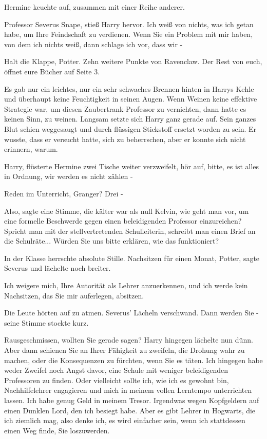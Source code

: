 Hermine keuchte auf, zusammen mit einer Reihe anderer.

\glqq{}Professor Severus Snape\grqq{}, stieß Harry hervor. \glqq{}Ich weiß von
nichts, was ich getan habe, um Ihre Feindschaft zu verdienen. Wenn Sie ein
Problem mit mir haben, von dem ich nichts weiß, dann schlage ich vor, dass wir
-\grqq{}

\glqq{}Halt die Klappe, Potter. Zehn weitere Punkte von Ravenclaw. Der Rest von
euch, öffnet eure Bücher auf Seite 3.\grqq{}

Es gab nur ein leichtes, nur ein sehr schwaches Brennen hinten in Harrys Kehle
und überhaupt keine Feuchtigkeit in seinen Augen. Wenn Weinen keine effektive
Strategie war, um diesen Zaubertrank-Professor zu vernichten, dann hatte es
keinen Sinn, zu weinen. Langsam setzte sich Harry ganz gerade auf. Sein ganzes
Blut schien weggesaugt und durch flüssigen Stickstoff ersetzt worden zu sein. Er
wusste, dass er versucht hatte, sich zu beherrschen, aber er konnte sich nicht
erinnern, warum.

\glqq{}Harry\grqq{}, flüsterte Hermine zwei Tische weiter verzweifelt, \glqq{}hör
auf, bitte, es ist alles in Ordnung, wir werden es nicht zählen -\grqq{}

\glqq{}Reden im Unterricht, Granger? Drei -\grqq{}

\glqq{}Also\grqq{}, sagte eine Stimme, die kälter war als null Kelvin, \glqq{}wie
geht man vor, um eine formelle Beschwerde gegen einen beleidigenden Professor
einzureichen? Spricht man mit der stellvertretenden Schulleiterin, schreibt man
einen Brief an die Schulräte... Würden Sie uns bitte erklären, wie das
funktioniert?\grqq{}

In der Klasse herrschte absolute Stille. \glqq{}Nachsitzen für einen Monat,
Potter\grqq{}, sagte Severus und lächelte noch breiter.

\glqq{}Ich weigere mich, Ihre Autorität als Lehrer anzuerkennen, und ich werde
kein Nachsitzen, das Sie mir auferlegen, absitzen.\grqq{}

Die Leute hörten auf zu atmen. Severus' Lächeln verschwand. \glqq{}Dann werden
Sie -\grqq{} seine Stimme stockte kurz.

\glqq{}Rausgeschmissen, wollten Sie gerade sagen?\grqq{} Harry hingegen lächelte
nun dünn. \glqq{}Aber dann schienen Sie an Ihrer Fähigkeit zu zweifeln, die
Drohung wahr zu machen, oder die Konsequenzen zu fürchten, wenn Sie es täten.
Ich hingegen habe weder Zweifel noch Angst davor, eine Schule mit weniger
beleidigenden Professoren zu finden. Oder vielleicht sollte ich, wie ich es
gewohnt bin, Nachhilfelehrer engagieren und mich in meinem vollen Lerntempo
unterrichten lassen. Ich habe genug Geld in meinem Tresor. Irgendwas wegen
Kopfgeldern auf einen Dunklen Lord, den ich besiegt habe. Aber es gibt Lehrer in
Hogwarts, die ich ziemlich mag, also denke ich, es wird einfacher sein, wenn ich
stattdessen einen Weg finde, Sie loszuwerden.\grqq{}

